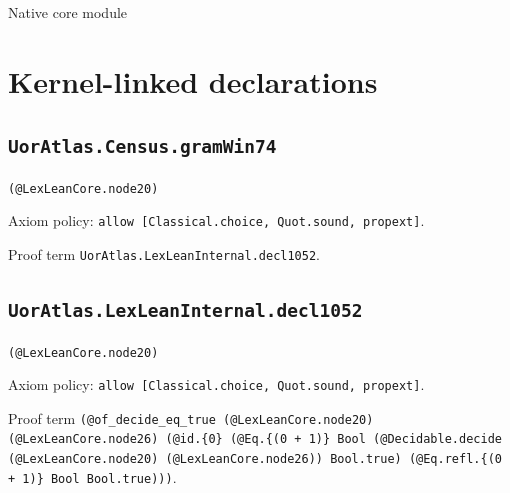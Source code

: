 \documentclass[11pt]{article}
\begin{document}
\begin{center}{\LARGE Native core module}\end{center}
\section*{Kernel-linked declarations}
\subsection*{\texttt{UorAtlas.Census.gramWin74}}
\noindent\texttt{(@LexLeanCore.node20)}\par
\noindent Axiom policy: \texttt{allow [Classical.choice, Quot.sound, propext]}.\par
\noindent Proof term \texttt{UorAtlas.LexLeanInternal.decl1052}.\par
\subsection*{\texttt{UorAtlas.LexLeanInternal.decl1052}}
\noindent\texttt{(@LexLeanCore.node20)}\par
\noindent Axiom policy: \texttt{allow [Classical.choice, Quot.sound, propext]}.\par
\noindent Proof term \texttt{(@of\_decide\_eq\_true (@LexLeanCore.node20) (@LexLeanCore.node26) (@id.\{0\} (@Eq.\{(0 + 1)\} Bool (@Decidable.decide (@LexLeanCore.node20) (@LexLeanCore.node26)) Bool.true) (@Eq.refl.\{(0 + 1)\} Bool Bool.true)))}.\par
\end{document}

